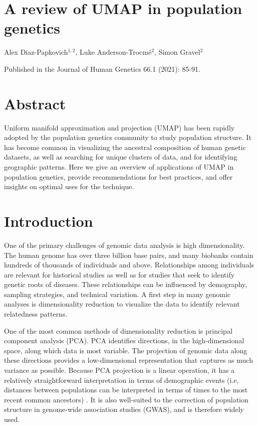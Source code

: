 \section*{A review of UMAP in population genetics}

Alex Diaz-Papkovich$^{1,2}$, Luke Anderson-Trocm\'{e}$^{2}$, Simon Gravel$^{2}$


Published in the Journal of Human Genetics 66.1 (2021): 85-91.

\section{Abstract}

Uniform manifold approximation and projection (UMAP) has been rapidly adopted by the population genetics community to study population structure. It has become common in visualizing the ancestral composition of human genetic datasets, as well as searching for unique clusters of data, and for identifying geographic patterns. Here we give an overview of applications of UMAP in population genetics, provide recommendations for best practices, and offer insights on optimal uses for the technique.

\section{Introduction}
One of the primary challenges of genomic data analysis is high dimensionality. The human genome has over three billion base pairs, and many biobanks contain hundreds of thousands of individuals and above. Relationships among individuals are relevant for historical studies as well as for studies that seek to identify genetic roots of diseases. These relationships can be influenced by demography, sampling strategies, and technical variation. A first step in many genomic analyses is dimensionality reduction to visualize the data to identify relevant relatedness patterns. 

One of the most common methods of dimensionality reduction is principal component analysis (PCA). PCA identifies directions, in the high-dimensional space, along which data is most variable. The projection of genomic data along these directions provides a low-dimensional representation that captures as much variance as possible. Because PCA projection is a linear operation, it has a relatively straightforward interpretation in terms of demographic events (i.e, distances between populations can be interpreted in terms of times to the most recent common ancestors) \citep{mcvean2009genealogical}.  It is also well-suited to the correction of population structure in genome-wide association studies (GWAS)\citep{patterson2006population}, and is therefore widely used.


